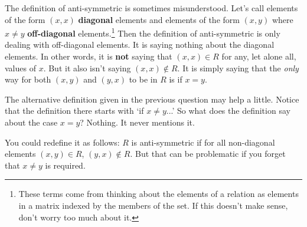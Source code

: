 \begin{rem}
The definition of anti-symmetric is sometimes misunderstood.  Let's call elements of the form $(x,x)$ {\bf diagonal} elements
and elements of the form $(x,y)$ where $x\neq y$ {\bf off-diagonal} elements.\footnote{These terms
come from thinking about the elements of a relation as elements in a matrix indexed by the members of
the set.  If this doesn't make sense, don't worry too much about it.}  
Then the definition of anti-symmetric is only dealing with off-diagonal elements.
It is saying nothing about the diagonal elements.
In other words, it is {\bf not} saying that $(x,x)\in R$ for any, let alone all, values of $x$.
But it also isn't saying $(x,x)\not\in R$.
It is simply saying that the {\em only} way for both $(x,y)$ and $(y,x)$ to be in $R$ is if $x=y$.

The alternative definition given in the previous question may help a little.  Notice that the
definition there starts with `if $x\neq y$...'  So what does the definition say about the case
$x=y$?  Nothing.  It never mentions it.

You could redefine it as follows: $R$ is anti-symmetric if for all non-diagonal elements $(x,y)\in R$,
$(y,x)\not\in R$.  But that can be problematic if you forget that $x\neq y$ is required.
\end{rem}
